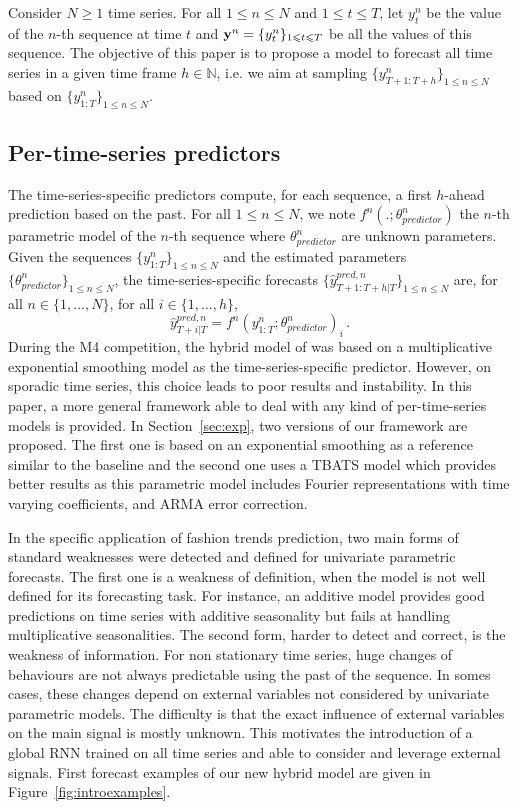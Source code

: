 \documentclass[review]{elsarticle}
\newcommand{\ts}{y}
\newcommand{\fullts}{{\bf \ts}}
\newcommand{\tspred}{\widehat{\ts}}
\newcommand{\stat}{f}
\newcommand{\statparam}{\theta_{predictor}}
\newcommand{\lag}{h}
\begin{document}
Consider $N\geqslant 1$ time series. For all $1\leqslant n \leqslant N$ and $1\leqslant t \leqslant T$, let $\ts_t^n$ be the value of the $n$-th sequence at time $t$ and  $\fullts^n = \{\ts_t^n\}_{1\leqslant t \leqslant T}$ be all the values of this sequence. The objective of this paper is to propose a model to  forecast all time series in a given time frame  $\lag \in \mathbb{N}$, i.e. we aim at sampling $\{\ts^n_{T+1:T+\lag}\}_{1\leqslant n \leqslant N}$ based on $\{\ts^n_{1:T}\}_{1\leqslant n \leqslant N}$.


\subsection{Per-time-series predictors}
The time-series-specific predictors compute, for each sequence, a first $\lag$-ahead prediction based on the past. For all $1\leqslant n \leqslant N$, we note $\stat^n(.;\statparam^n)$ the $n$-th parametric model of the $n$-th sequence where $\statparam^n$ are  unknown parameters. Given the sequences $\{\ts^n_{1:T}\}_{1\leqslant n \leqslant N}$ and the estimated  parameters $\{\statparam^n\}_{1\leqslant n \leqslant N}$, the time-series-specific forecasts $\{\tspred^{pred,n}_{T+1:T+\lag|T}\}_{1\leqslant n \leqslant N}$ are, for all $n \in \{1,\ldots,N\}$, for all $i \in \{1,\ldots,\lag\}$,
$$
\tspred^{pred,n}_{T+i|T} = \stat^n(\ts^n_{1:T};\statparam^n)_i\,.
$$
During the M4 competition, the hybrid model of \cite{smyl2020hybrid} was based on a multiplicative exponential smoothing model as the time-series-specific predictor. However, on sporadic time series, this choice leads to poor results and instability. In this paper, a more general framework able to deal with any kind of per-time-series models is provided. In Section~\ref{sec:exp}, two versions of our framework are proposed. The first one is based on an  exponential smoothing as a reference similar to the baseline \cite{smyl2020hybrid} and the second one uses a TBATS model \cite{doi:10.1198/jasa.2011.tm09771} which provides better results as this parametric model includes  Fourier representations with time varying coefficients, and ARMA error correction. 

In the specific application of fashion trends prediction, two main forms of standard weaknesses were detected and defined for univariate parametric forecasts. The first one is a weakness of definition, when the model is not well defined for its forecasting task. For instance, an additive model provides good predictions on time series with additive seasonality but fails at handling multiplicative seasonalities. The second form, harder to detect and correct, is the weakness of information. For non stationary time series, huge changes of behaviours are not always predictable using the past of the sequence. In somes cases, these changes depend on external variables not considered by univariate parametric models. The difficulty is that the exact influence of external variables on the main signal is mostly unknown. This motivates the introduction of a global RNN trained on all time series and able to consider and leverage external signals. First forecast examples of our new hybrid model are given in Figure~\ref{fig:introexamples}.
\end{document}
